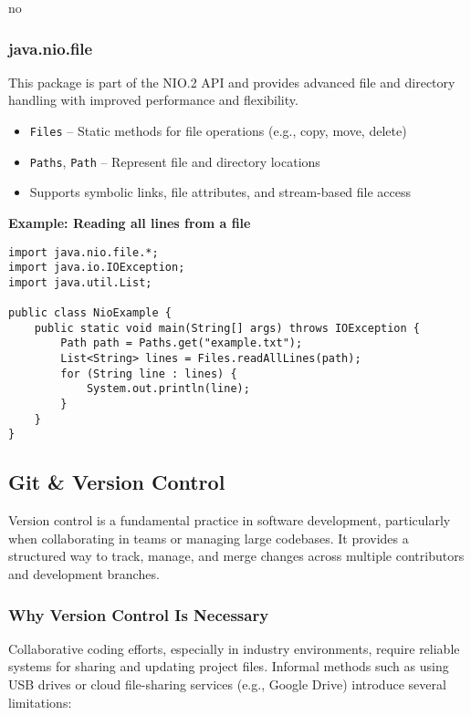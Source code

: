 no\documentclass{article}
\begin{document}
\subsubsection*{java.nio.file}

This package is part of the NIO.2 API and provides advanced file and directory handling with improved performance and flexibility.

\begin{itemize}
    \item \texttt{Files} – Static methods for file operations (e.g., copy, move, delete)
    \item \texttt{Paths}, \texttt{Path} – Represent file and directory locations
    \item Supports symbolic links, file attributes, and stream-based file access
\end{itemize}

\noindent\textbf{Example: Reading all lines from a file}
\begin{verbatim}
import java.nio.file.*;
import java.io.IOException;
import java.util.List;

public class NioExample {
    public static void main(String[] args) throws IOException {
        Path path = Paths.get("example.txt");
        List<String> lines = Files.readAllLines(path);
        for (String line : lines) {
            System.out.println(line);
        }
    }
}
\end{verbatim}

\subsection{Git \& Version Control}

Version control is a fundamental practice in software development, particularly when collaborating in teams or managing large codebases. It provides a structured way to track, manage, and merge changes across multiple contributors and development branches.

\subsubsection{Why Version Control Is Necessary}

Collaborative coding efforts, especially in industry environments, require reliable systems for sharing and updating project files. Informal methods such as using USB drives or cloud file-sharing services (e.g., Google Drive) introduce several limitations:
\end{document}
